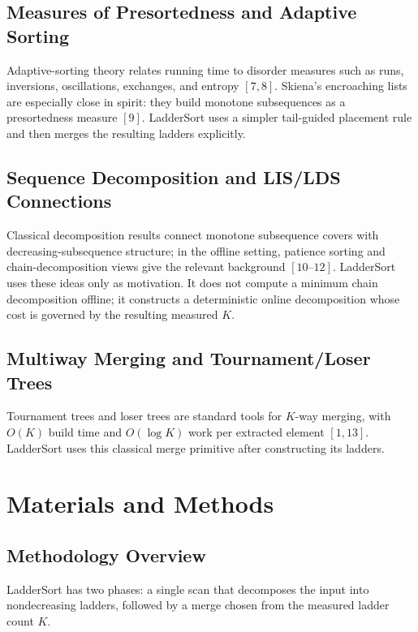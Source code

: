 \documentclass[10pt]{article}
\begin{document}
\subsection{Measures of Presortedness and Adaptive Sorting}\label{measures-of-presortedness}

Adaptive-sorting theory relates running time to disorder measures such as runs, inversions, oscillations, exchanges, and entropy \([7,8]\). Skiena's encroaching lists are especially close in spirit: they build monotone subsequences as a presortedness measure \([9]\). LadderSort uses a simpler tail-guided placement rule and then merges the resulting ladders explicitly.

\subsection{Sequence Decomposition and LIS/LDS Connections}\label{sequence-decomposition}

Classical decomposition results connect monotone subsequence covers with decreasing-subsequence structure; in the offline setting, patience sorting and chain-decomposition views give the relevant background \([10\text{--}12]\). LadderSort uses these ideas only as motivation. It does not compute a minimum chain decomposition offline; it constructs a deterministic online decomposition whose cost is governed by the resulting measured \(K\).

\subsection{Multiway Merging and Tournament/Loser Trees}\label{multiway-merging}

Tournament trees and loser trees are standard tools for \(K\)-way merging, with \(O(K)\) build time and \(O(\log K)\) work per extracted element \([1,13]\). LadderSort uses this classical merge primitive after constructing its ladders.

\section{Materials and Methods}\label{materials-and-methods}

\subsection{Methodology Overview}\label{methodology-overview}

LadderSort has two phases: a single scan that decomposes the input into nondecreasing ladders, followed by a merge chosen from the measured ladder count \(K\).
\end{document}
